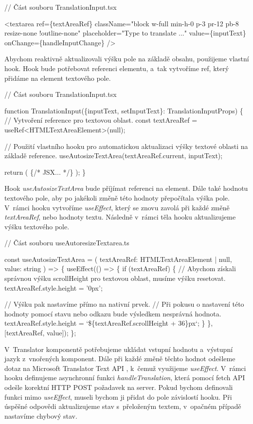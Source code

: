 \begin{prog}
// Část souboru TranslationInput.tsx

<textarea
  ref=\{textAreaRef\}
  className="block w-full min-h-0 p-3 pr-12 pb-8 resize-none !outline-none"
  placeholder="Type to translate ..."
  value=\{inputText\}
  onChange=\{handleInputChange\}
/>
\end{prog}

Abychom reaktivně aktualizovali výšku pole na základě obsahu, použijeme vlastní hook. 
Hook bude potřebovat referenci elementu, a~tak vytvoříme ref, který přidáme na element textového pole.

\begin{prog}
// Část souboru TranslationInput.tsx

function TranslationInput(\{inputText, setInputText\}: TranslationInputProps) \{
  // Vytvoření reference pro textovou oblast.
  const textAreaRef = useRef<HTMLTextAreaElement>(null);

  // Použití vlastního hooku pro automatickou aktualizaci výšky
    textové oblasti na základě reference.
  useAutosizeTextArea(textAreaRef.current, inputText);

  return (
    \{/* JSX... */\}
  );
\}
\end{prog}

Hook \emph{useAutosizeTextArea} bude příjímat referenci na element. Dále také hodnotu textového pole, aby po jakékoli změně této hodnoty přepočítala výška pole. 
V~rámci hooku vytvoříme \emph{useEffect}, který se znovu zavolá při každé změně \emph{textAreaRef}, nebo hodnoty textu. Následně v~rámci těla hooku aktualizujeme výšku textového pole.

\begin{prog}
// Část souboru useAutoresizeTextarea.ts

const useAutosizeTextArea = (
  textAreaRef: HTMLTextAreaElement | null, value: string
) => \{
  useEffect(() => \{
    if (textAreaRef) \{
      // Abychom získali správnou výšku scrollHeight 
        pro textovou oblast, musíme výšku resetovat.
      textAreaRef.style.height = '0px';

      // Výšku pak nastavíme přímo na nativní prvek.
      // Při pokusu o nastavení této hodnoty pomocí stavu 
        nebo odkazu bude výsledkem nesprávná hodnota.
      textAreaRef.style.height = `\$\{textAreaRef.scrollHeight + 36\}px`;
    \}
  \}, [textAreaRef, value]);
\};
\end{prog}

V~Translator komponentě potřebujeme ukládat vstupní hodnotu a~výstupní jazyk z~vnořených komponent. 
Dále při každé změně těchto hodnot odešleme dotaz na Microsoft Translator Text API \cite{translatortextapi}, k~čemuž využijeme \emph{useEffect}.
V~rámci hooku definujeme asynchronní funkci \emph{handleTranslation}, která pomocí fetch API odešle korektní HTTP POST požadavek na server. 
Pokud bychom definovali funkci mimo \emph{useEffect}, museli bychom ji přidat do pole závislostí hooku.
Při úspěšné odpovědi aktualizujeme stav s~přeloženým textem, v~opačném případě nastavíme chybový stav.

